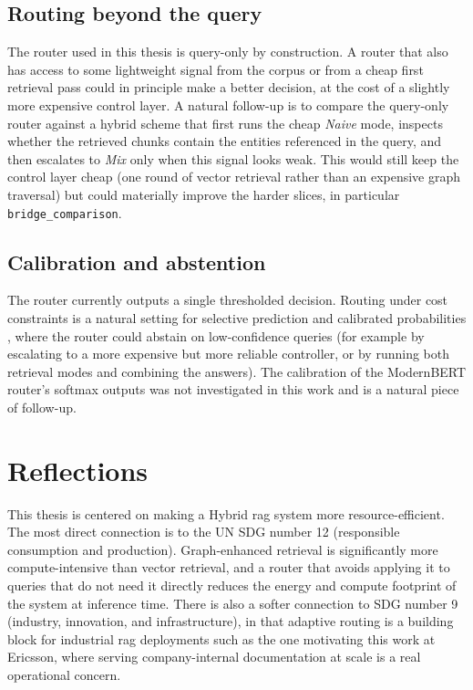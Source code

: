 \documentclass[english, bibtex]{kththesis}               %
\numberwithin{listing}{chapter}
\begin{document}
\subsection{Routing beyond the query}
\label{sec:limitRouting}

The router used in this thesis is query-only by construction. A router that also has access to some lightweight signal from the corpus or from a cheap first retrieval pass could in principle make a better decision, at the cost of a slightly more expensive control layer. A natural follow-up is to compare the query-only router against a hybrid scheme that first runs the cheap \emph{Naive} mode, inspects whether the retrieved chunks contain the entities referenced in the query, and then escalates to \emph{Mix} only when this signal looks weak. This would still keep the control layer cheap (one round of vector retrieval rather than an expensive graph traversal) but could materially improve the harder slices, in particular \texttt{bridge\_comparison}.

\subsection{Calibration and abstention}
\label{sec:limitCalibration}

The router currently outputs a single thresholded decision. Routing under cost constraints is a natural setting for selective prediction \cite{geifman2017selective} and calibrated probabilities \cite{guo2017calibration}, where the router could abstain on low-confidence queries (for example by escalating to a more expensive but more reliable controller, or by running both retrieval modes and combining the answers). The calibration of the ModernBERT router's softmax outputs was not investigated in this work and is a natural piece of follow-up.

\section{Reflections}
\label{sec:reflections}

This thesis is centered on making a Hybrid \gls{rag} system more resource-efficient. The most direct connection is to the \gls{UN} \gls{SDG} number 12 (responsible consumption and production). Graph-enhanced retrieval is significantly more compute-intensive than vector retrieval, and a router that avoids applying it to queries that do not need it directly reduces the energy and compute footprint of the system at inference time. There is also a softer connection to \gls{SDG} number 9 (industry, innovation, and infrastructure), in that adaptive routing is a building block for industrial \gls{rag} deployments such as the one motivating this work at Ericsson, where serving company-internal documentation at scale is a real operational concern.
\end{document}
